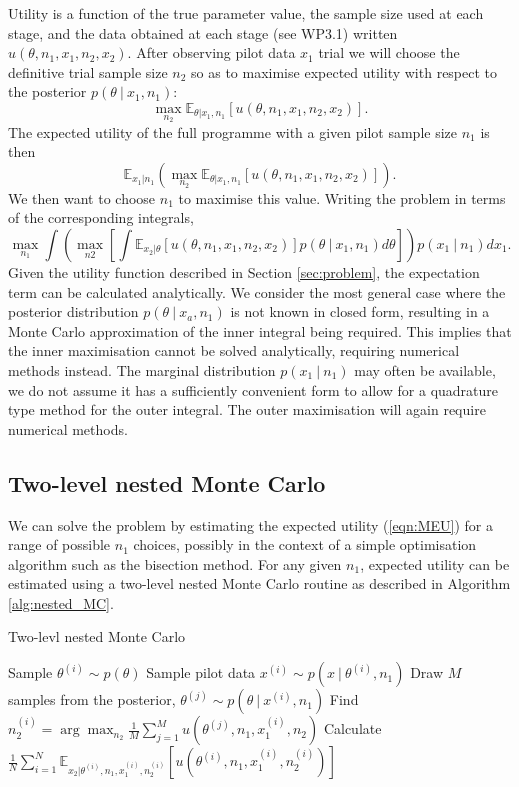 \documentclass[sagev, Crown]{sagej} %
\begin{document}
Utility is a function of the true parameter value, the sample size used at each stage, and the data obtained at each stage (see WP3.1) written $u(\theta, n_1, x_1, n_2, x_2)$. After observing pilot data $x_1$ trial we will choose the definitive trial sample size $n_2$ so as to maximise expected utility with respect to the posterior $p(\theta ~|~ x_1, n_1)$:
$$
\max_{n_2} \mathbb{E}_{\theta | x_1, n_1}[u(\theta, n_1, x_1, n_2, x_2)].
$$
The expected utility of the full programme with a given pilot sample size $n_1$ is then
\begin{equation}\label{eqn:MEU}
\mathbb{E}_{x_1 | n_1} \left( \max_{n_2} \mathbb{E}_{\theta | x_1, n_1}[u(\theta, n_1, x_1, n_2, x_2)] \right).
\end{equation}
We then want to choose $n_1$ to maximise this value. Writing the problem in terms of the corresponding integrals,
$$
\max_{n_1} \int \left( \max_{n2} \left[ \int \mathbb{E}_{x_2 | \theta}[u(\theta, n_1, x_1, n_2, x_2)] p(\theta ~|~ x_1, n_1) d\theta \right] \right) p(x_1 ~|~ n_1) dx_1.
$$
Given the utility function described in Section \ref{sec:problem}, the expectation term can be calculated analytically. We consider the most general case where the posterior distribution $p(\theta ~|~ x_a, n_1)$ is not known in closed form, resulting in a Monte Carlo approximation of the inner integral being required. This implies that the inner maximisation cannot be solved analytically, requiring numerical methods instead. The marginal distribution $p(x_1 ~|~ n_1)$ may often be available, we do not assume it has a sufficiently convenient form to allow for a quadrature type method for the outer integral. The outer maximisation will again require numerical methods.

\subsection{Two-level nested Monte Carlo}\label{sec:nested_MC}

We can solve the problem by estimating the expected utility (\ref{eqn:MEU}) for a range of possible $n_1$ choices, possibly in the context of a simple optimisation algorithm such as the bisection method. For any given $n_1$, expected utility can be estimated using a two-level nested Monte Carlo routine as described in Algorithm \ref{alg:nested_MC}. 

\begin{algorithm}
\caption{Two-levl nested Monte Carlo}\label{alg:nested_MC}
\begin{algorithmic}[1]
\State Sample $\theta^{(i)} \sim p(\theta)$
\State Sample pilot data $x^{(i)} \sim p(x ~|~ \theta^{(i)}, n_1)$
\State Draw $M$ samples from the posterior, $\theta^{(j)} \sim p(\theta ~|~ x^{(i)}, n_1)$
\State Find  $n_2^{(i)} = \arg\max_{n_2} \frac{1}{M} \sum_{j=1}^{M} u(\theta^{(j)}, n_1, x_1^{(i)}, n_2)$
\EndFor 
\State Calculate $\frac{1}{N} \sum_{i=1}^{N} \mathbb{E}_{x_2 | \theta^{(i)}, n_1, x_1^{(i)}, n_2^{(i)}}[ u(\theta^{(i)}, n_1, x_1^{(i)}, n_2^{(i)}) ]$
\end{algorithmic}
\end{algorithm}
\end{document}
